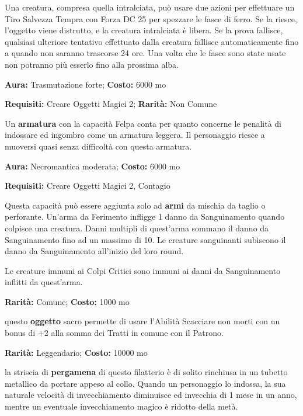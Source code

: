 \begin{multicols}{2}
Una creatura, compresa quella intralciata, può usare due azioni per effettuare un Tiro Salvezza Tempra con Forza DC 25 per spezzare le fasce di ferro. Se la riesce, l'oggetto viene distrutto, e la creatura intralciata è libera. Se la prova fallisce, qualsiasi ulteriore tentativo effettuato dalla creatura fallisce automaticamente fino a quando non saranno trascorse 24 ore. Una volta che le fasce sono state usate non potranno più esserlo fino alla prossima alba.


\textbf{Aura:} Trasmutazione forte; \textbf{Costo:} 6000 mo

\textbf{Requisiti:} Creare Oggetti Magici 2; \textbf{Rarità:} Non Comune

Un \textbf{armatura} con la capacità Felpa conta per quanto concerne le penalità di indossare ed ingombro come un armatura leggera. Il personaggio riesce a muoversi quasi senza difficoltà con questa armatura.


\textbf{Aura:} Necromantica moderata; \textbf{Costo:} 6000 mo

\textbf{Requisiti:} Creare Oggetti Magici 2, Contagio

Questa capacità può essere aggiunta solo ad \textbf{armi} da mischia da taglio o perforante. Un'arma da Ferimento infligge 1 danno da Sanguinamento quando colpisce una creatura. Danni multipli di quest'arma sommano il danno da Sanguinamento fino ad un massimo di 10.
Le creature sanguinanti subiscono il danno da Sanguinamento all'inizio del loro round.

Le creature immuni ai Colpi Critici sono immuni ai danni da Sanguinamento inflitti da quest'arma.


\textbf{Rarità:} Comune; \textbf{Costo:} 1000 mo

questo \textbf{oggetto} sacro permette di usare l'Abilità Scacciare non morti con un bonus di +2 alla somma dei Tratti in comune con il Patrono.


\textbf{Rarità:} Leggendario; \textbf{Costo:} 10000 mo

la striscia di \textbf{pergamena} di questo filatterio è di solito rinchiusa in un tubetto metallico da portare appeso al collo. Quando un personaggio lo indossa, la sua naturale velocità di invecchiamento diminuisce ed invecchia di 1 mese in un anno, mentre un eventuale invecchiamento magico è ridotto della metà.


\end{multicols}
